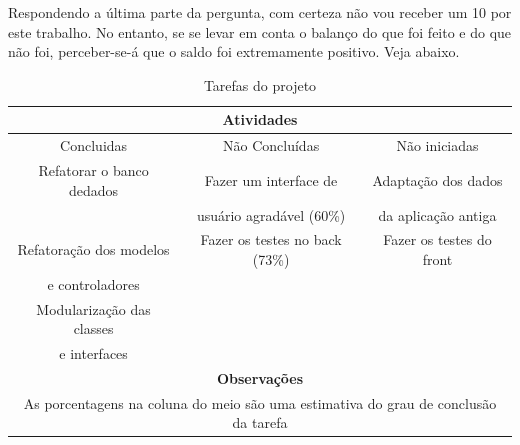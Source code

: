 Respondendo a última parte da pergunta, com certeza não vou receber um 10 por este trabalho. No entanto, se se levar
em conta o balanço do que foi feito e do que não foi, perceber-se-á que o saldo foi extremamente positivo. Veja abaixo.

\begin{table}[h]
    \centering
    \begin{tabular}{|c|c|c|}
        \hline
        \multicolumn{3}{|c|}{Atividades} \\ \hline\hline
        Concluidas & Não Concluídas & Não iniciadas \\ \hline
        Refatorar o banco dedados & Fazer um interface de  & Adaptação dos dados \\
        & usuário agradável (60\%) & da aplicação antiga \\ \hline
        Refatoração dos modelos  & Fazer os testes no back (73\%) & Fazer os testes do front \\
        e controladores & & \\ \hline
        Modularização das classes  & & \\
        e interfaces  & & \\ \hline\hline
        \multicolumn{3}{|c|}{\textbf{Observações}} \\ \hline
        \multicolumn{3}{|c|}{As porcentagens na coluna do meio são uma estimativa do grau de conclusão da tarefa} \\ \hline
    \end{tabular}
    \caption{Tarefas do projeto}
    \label{table:activity}
\end{table}